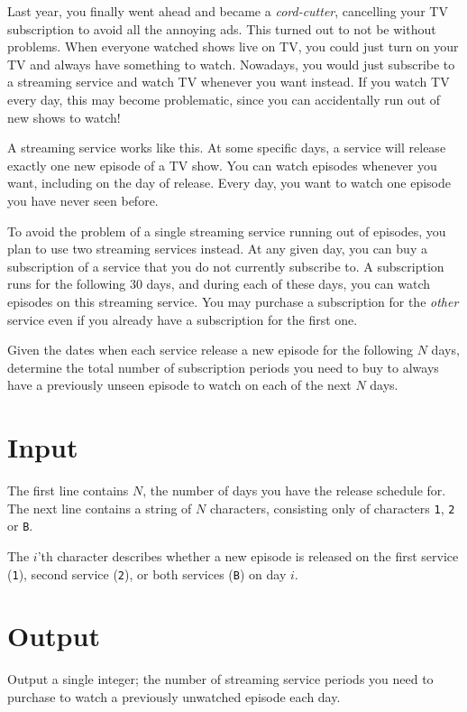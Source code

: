 Last year, you finally went ahead and became a \emph{cord-cutter}, cancelling your TV subscription to avoid all the annoying ads.
This turned out to not be without problems.
When everyone watched shows live on TV, you could just turn on your TV and always have something to watch.
Nowadays, you would just subscribe to a streaming service and watch TV whenever you want instead.
If you watch TV every day, this may become problematic, since you can accidentally run out of new shows to watch!

A streaming service works like this.
At some specific days, a service will release exactly one new episode of a TV show.
You can watch episodes whenever you want, including on the day of release.
Every day, you want to watch one episode you have never seen before.

To avoid the problem of a single streaming service running out of episodes, you plan to use two streaming services instead.
At any given day, you can buy a subscription of a service that you do not currently subscribe to.
A subscription runs for the following $30$ days, and during each of these days, you can watch episodes on this streaming service.
You may purchase a subscription for the \emph{other} service even if you already have a subscription for the first one.

Given the dates when each service release a new episode for the following $N$ days, determine the total number of subscription periods you need to buy to always have a previously unseen episode to watch on each of the next $N$ days.

\section*{Input}
The first line contains $N$, the number of days you have the release schedule for.
The next line contains a string of $N$ characters, consisting only of characters \texttt{1}, \texttt{2} or \texttt{B}.

The $i$'th character describes whether a new episode is released on the first service (\texttt{1}), second service (\texttt{2}), or both services (\texttt{B}) on day $i$.

\section*{Output}
Output a single integer; the number of streaming service periods you need to purchase to watch a previously unwatched episode each day.

